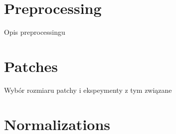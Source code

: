 \section{Preprocessing}

Opis preprocessingu

\section{Patches}

Wybór rozmiaru patchy i ekspeymenty z tym związane

\section{Normalizations}

